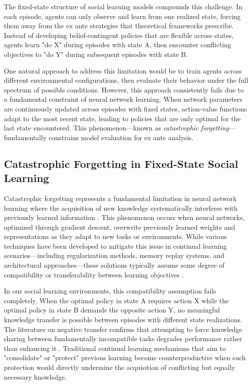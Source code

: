 The fixed-state structure of social learning models compounds this challenge. In each episode, agents can only observe and learn from one realized state, forcing them away from the ex ante strategies that theoretical frameworks prescribe. Instead of developing belief-contingent policies that are flexible across states, agents learn "do X" during episodes with state A, then encounter conflicting objectives to "do Y" during subsequent episodes with state B. 

One natural approach to address this limitation would be to train agents across different environmental configurations, then evaluate their behavior under the full spectrum of possible conditions. However, this approach consistently fails due to a fundamental constraint of neural network learning. When network parameters are continuously updated across episodes with fixed states, action-value functions adapt to the most recent state, leading to policies that are only optimal for the last state encountered. This phenomenon—known as \emph{catastrophic forgetting}—fundamentally constrains model evaluation for ex ante analysis.

\subsection{Catastrophic Forgetting in Fixed-State Social Learning}

Catastrophic forgetting represents a fundamental limitation in neural network learning where the acquisition of new knowledge systematically interferes with previously learned information \citep{vandeven2024continuallearningcatastrophicforgetting}. This phenomenon occurs when neural networks, optimized through gradient descent, overwrite previously learned weights and representations as they adapt to new tasks or environments. While various techniques have been developed to mitigate this issue in continual learning scenarios—including regularization methods, memory replay systems, and architectural approaches—these solutions typically assume some degree of compatibility or transferability between learning objectives \citep{kirkpatrick2017overcoming, zenke2017continuallearningsynapticintelligence, rebuffi2017icarl, rusu2016progressive}.


In our social learning environments, this compatibility assumption fails completely. When the optimal policy in state A requires action X while the optimal policy in state B demands the opposite action Y, no meaningful knowledge transfer is possible between episodes with different state realizations. The literature on negative transfer confirms that attempting to force knowledge sharing between fundamentally incompatible tasks degrades performance rather than enhancing it \citep{ahn2024catastrophic, wu2021online}. Traditional continual learning mechanisms that aim to "consolidate" or "protect" previous learning become counterproductive when such protection would directly undermine the acquisition of conflicting but equally necessary knowledge.

